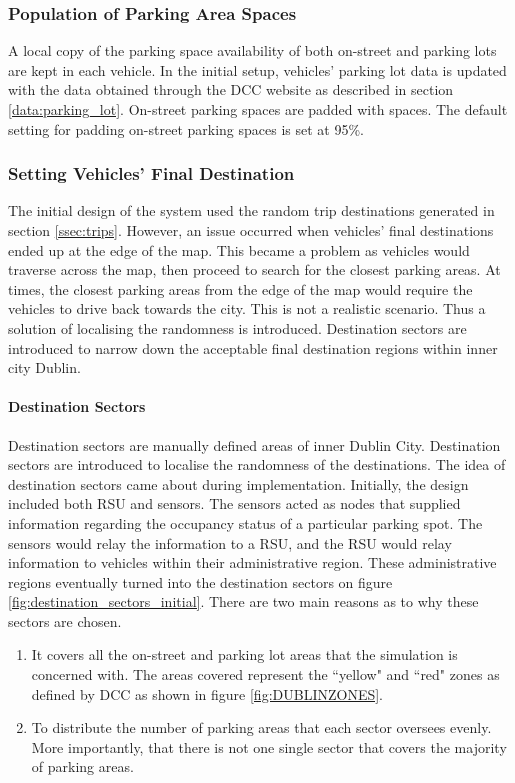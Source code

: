 \subsubsection{Population of Parking Area Spaces}
A local copy of the parking space availability of both on-street and parking lots are kept in each vehicle. In the initial setup, vehicles' parking lot data is updated with the data obtained through the \ac{DCC} website as described in section \ref{data:parking_lot}. On-street parking spaces are padded with spaces. The default setting for padding on-street parking spaces is set at 95\%.

\subsubsection{Setting Vehicles' Final Destination}
The initial design of the system used the random trip destinations generated in section \ref{ssec:trips}. However, an issue occurred when vehicles' final destinations ended up at the edge of the map. This became a problem as vehicles would traverse across the map, then proceed to search for the closest parking areas. At times, the closest parking areas from the edge of the map would require the vehicles to drive back towards the city. This is not a realistic scenario. Thus a solution of localising the randomness is introduced. Destination sectors are introduced to narrow down the acceptable final destination regions within inner city Dublin.

\paragraph{Destination Sectors}
Destination sectors are manually defined areas of inner Dublin City. Destination sectors are introduced to localise the randomness of the destinations. The idea of destination sectors came about during implementation. Initially, the design included both \ac{RSU} and sensors. The sensors acted as nodes that supplied information regarding the occupancy status of a particular parking spot. The sensors would relay the information to a \ac{RSU}, and the \ac{RSU} would relay information to vehicles within their administrative region. These administrative regions eventually turned into the destination sectors on figure \ref{fig:destination_sectors_initial}. There are two main reasons as to why these sectors are chosen.

\begin{enumerate}
    \item It covers all the on-street and parking lot areas that the simulation is concerned with. The areas covered represent the ``yellow" and ``red" zones as defined by DCC as shown in figure \ref{fig:DUBLINZONES}.
    \item To distribute the number of parking areas that each sector oversees evenly. More importantly, that there is not one single sector that covers the majority of parking areas.
\end{enumerate}

